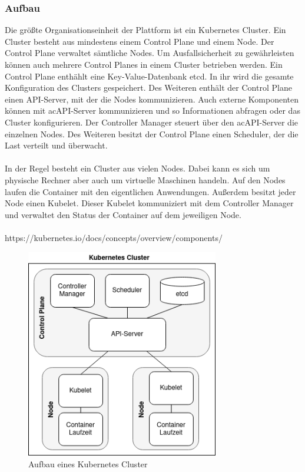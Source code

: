 \subsubsection{Aufbau}

Die größte Organisationseinheit der Plattform ist ein Kubernetes Cluster. Ein Cluster besteht aus mindestens einem Control Plane und einem Node. Der Control Plane verwaltet sämtliche Nodes. Um Ausfallsicherheit zu gewährleisten können auch mehrere Control Planes in einem Cluster betrieben werden. Ein Control Plane enthählt eine Key-Value-Datenbank etcd. In ihr wird die gesamte Konfiguration des Clusters gespeichert. Des Weiteren enthält der Control Plane einen \ac{API}-Server, mit der die Nodes kommunizieren. Auch externe Komponenten können mit ac{API}-Server kommunizieren und so Informationen abfragen oder das Cluster konfigurieren. Der Controller Manager steuert über den ac{API}-Server die einzelnen Nodes. Des Weiteren besitzt der Control Plane einen Scheduler, der die Last verteilt und überwacht.  \\
\\
In der Regel besteht ein Cluster aus vielen Nodes. Dabei kann es sich um physische Rechner aber auch um virtuelle Maschinen handeln. Auf den Nodes laufen die Container mit den eigentlichen Anwendungen. Außerdem besitzt jeder Node einen Kubelet. Dieser Kubelet kommuniziert mit dem Controller Manager und verwaltet den Status der Container auf dem jeweiligen Node. \\
\\
{https://kubernetes.io/docs/concepts/overview/components/}

\begin{figure}[H] 
    \centering
    \includegraphics[width=0.75\textwidth]{figures/KubernetesCluster.png}
    \caption{Aufbau eines Kubernetes Cluster}
\end{figure}

